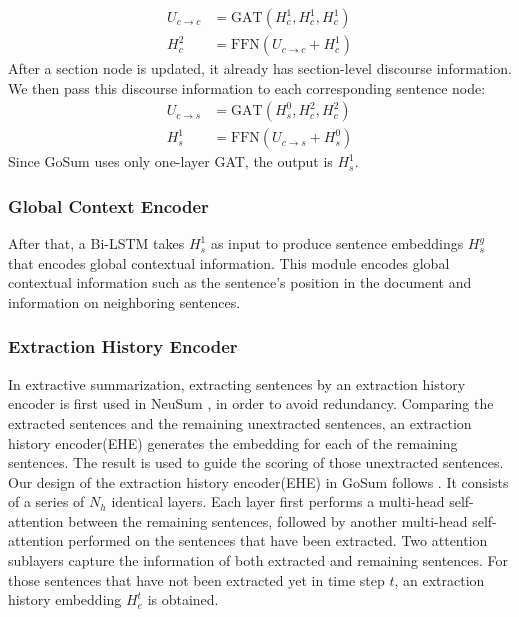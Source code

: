 \documentclass[11pt,a4paper]{article}
\begin{document}
\begin{align}
    U_{c\rightarrow c} &= \text{GAT} ({H}_c^1, {H}_c^1, {H}_c^1) \\
    {H}_c^2 &= \text{FFN}(U_{c\rightarrow c} + {H}_c^1)
\end{align} \label{eq:mp3}
After a section node is updated, it already has section-level discourse information. We then pass this discourse information to each corresponding sentence node:
\begin{align}
    U_{c\rightarrow s} &= \text{GAT} ({H}_s^0, {H}_c^2, {H}_c^2) \\
    {H}_s^1 &= \text{FFN}(U_{c\rightarrow s} + {H}_s^0)
\end{align}
Since GoSum uses only one-layer GAT, the output is ${H}_s^1$.

\subsubsection{Global Context Encoder}
After that, a Bi-LSTM takes ${H}_s^1$ as input to produce sentence embeddings ${H}_s^g$ that encodes global contextual information. 
This module encodes global contextual information such as the sentence’s position in the document and information on neighboring sentences.


\subsubsection{Extraction History Encoder}
In extractive summarization, extracting sentences by an extraction history encoder is first used in NeuSum \cite{neusumm_history_2018}, in order to avoid redundancy.
Comparing the extracted sentences and the remaining unextracted sentences, an extraction history encoder(EHE) generates the embedding for each of the remaining sentences. The result is used to guide the scoring of those unextracted sentences.
Our design of the extraction history encoder(EHE) in GoSum follows \cite{memsum_2022}.
It consists of a series of $N_h$ identical layers.
Each layer first performs a multi-head self-attention between the remaining sentences, followed by another multi-head self-attention performed on the sentences that have been extracted.
Two attention sublayers capture the information of both extracted and remaining sentences.
For those sentences that have not been extracted yet in time step $t$, an extraction history embedding ${H}_e^t$ is obtained.
\end{document}
